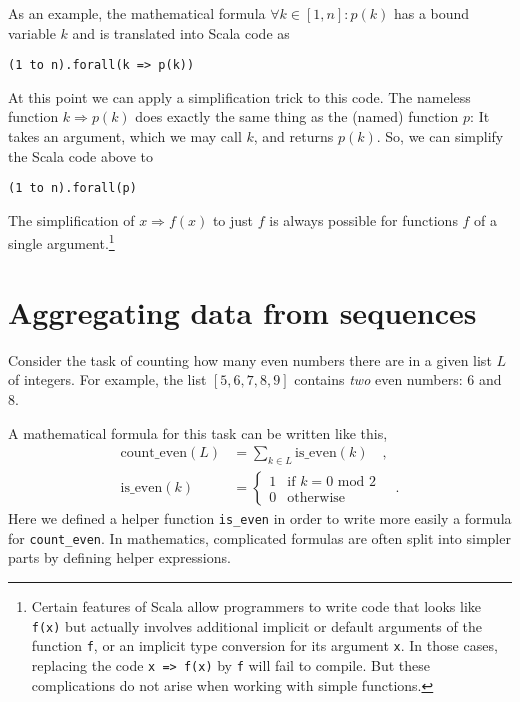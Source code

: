 As an example, the mathematical formula $\forall k\in\left[1,n\right]:p\left(k\right)$
has a bound variable $k$ and is translated into Scala code as

\begin{lstlisting}
(1 to n).forall(k => p(k))
\end{lstlisting}
At this point we can apply a simplification trick to this code. The
nameless function $k\Rightarrow p(k)$ does exactly the same thing
as the (named) function $p$: It takes an argument, which we may call
$k$, and returns $p(k)$. So, we can simplify the Scala code above
to

\begin{lstlisting}
(1 to n).forall(p)
\end{lstlisting}

The simplification of $x\Rightarrow f(x)$ to just $f$ is always
possible for functions $f$ of a single argument.\footnote{Certain features of Scala allow programmers to write code that looks
like \lstinline!f(x)! but actually involves additional implicit or
default arguments of the function \lstinline!f!, or an implicit type
conversion for its argument \lstinline!x!. In those cases, replacing
the code \lstinline!x => f(x)! by \lstinline!f! will fail to compile.
But these complications do not arise when working with simple functions.}

\section{Aggregating data from sequences}

Consider the task of counting how many even numbers there are in a
given list $L$ of integers. For example, the list $\left[5,6,7,8,9\right]$
contains \emph{two} even numbers: $6$ and $8$.

A mathematical formula for this task can be written like this,
\begin{align*}
\text{count\_even}\left(L\right) & =\sum_{k\in L}\text{is\_even}\left(k\right)\quad,\\
\text{is\_even}\left(k\right) & =\begin{cases}
1 & \text{if }k=0\text{ mod }2\\
0 & \text{otherwise}
\end{cases}\quad.
\end{align*}
Here we defined a helper function \texttt{}\lstinline!is_even! in
order to write more easily a formula for \lstinline!count_even!.
In mathematics, complicated formulas are often split into simpler
parts by defining helper expressions. 

